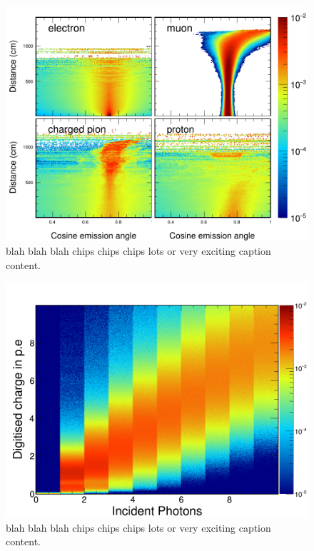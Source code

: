 \begin{figure}
    \includegraphics[width=\largefigwidth]{diagrams/cvn/emission_profile}
    \caption[emisson_profile]%
    {blah blah blah chips chips chips lots or very exciting caption content.}
    \label{fig:emisson_profile}
\end{figure}

\begin{figure}
    \includegraphics[width=\largefigwidth]{diagrams/cvn/digi_method}
    \caption[digi_method]%
    {blah blah blah chips chips chips lots or very exciting caption content.}
    \label{fig:digi_method}
\end{figure}

